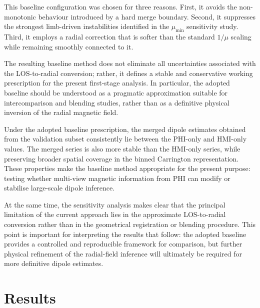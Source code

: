 \documentclass[namedreferences,hyperref,optionalrh]{spr-sola}
\begin{document}
This baseline configuration was chosen for three reasons. First, it avoids the non-monotonic behaviour introduced by a hard merge boundary. Second, it suppresses the strongest limb-driven instabilities identified in the $\mu_{\min}$ sensitivity study. Third, it employs a radial correction that is softer than the standard $1/\mu$ scaling while remaining smoothly connected to it.

The resulting baseline method does not eliminate all uncertainties associated with the LOS-to-radial conversion; rather, it defines a stable and conservative working prescription for the present first-stage analysis. In particular, the adopted baseline should be understood as a pragmatic approximation suitable for intercomparison and blending studies, rather than as a definitive physical inversion of the radial magnetic field.


Under the adopted baseline prescription, the merged dipole estimates obtained from the validation subset consistently lie between the PHI-only and HMI-only values. The merged series is also more stable than the HMI-only series, while preserving broader spatial coverage in the binned Carrington representation. These properties make the baseline method appropriate for the present purpose: testing whether multi-view magnetic information from PHI can modify or stabilise large-scale dipole inference.

At the same time, the sensitivity analysis makes clear that the principal limitation of the current approach lies in the approximate LOS-to-radial conversion rather than in the geometrical registration or blending procedure. This point is important for interpreting the results that follow: the adopted baseline provides a controlled and reproducible framework for comparison, but further physical refinement of the radial-field inference will ultimately be required for more definitive dipole estimates.


\section{Results}
\label{sec:results}

\end{document}
